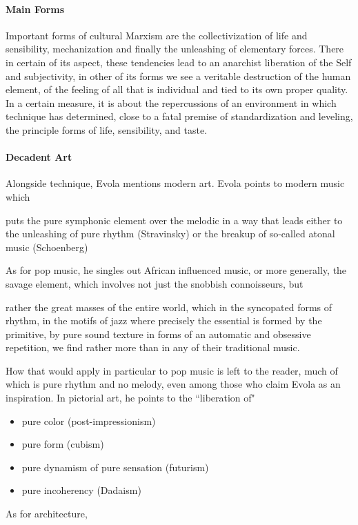 \paragraph{Main Forms}
\begin{quotex}
Important forms of cultural Marxism are the collectivization of life and sensibility, mechanization and finally the unleashing of elementary forces. There in certain of its aspect, these tendencies lead to an anarchist liberation of the Self and subjectivity, in other of its forms we see a veritable destruction of the human element, of the feeling of all that is individual and tied to its own proper quality. In a certain measure, it is about the repercussions of an environment in which technique has determined, close to a fatal premise of standardization and leveling, the principle forms of life, sensibility, and taste.

\end{quotex}
\paragraph{Decadent Art}
Alongside technique, Evola mentions modern art. Evola points to modern music which

\begin{quotex}
puts the pure symphonic element over the melodic in a way that leads either to the unleashing of pure rhythm (Stravinsky) or the breakup of so-called atonal music (Schoenberg)

\end{quotex}
As for pop music, he singles out African influenced music, or more generally, the savage element, which involves not just the snobbish connoisseurs, but

\begin{quotex}
rather the great masses of the entire world, which in the syncopated forms of rhythm, in the motifs of jazz where precisely the essential is formed by the primitive, by pure sound texture in forms of an automatic and obsessive repetition, we find rather more than in any of their traditional music.

\end{quotex}
How that would apply in particular to pop music is left to the reader, much of which is pure rhythm and no melody, even among those who claim Evola as an inspiration. In pictorial art, he points to the ``liberation of"

\begin{itemize}
\item pure color (post-impressionism) 
\item pure form (cubism) 
\item pure dynamism of pure sensation (futurism) 
\item pure incoherency (Dadaism) 
\end{itemize}
As for architecture,

